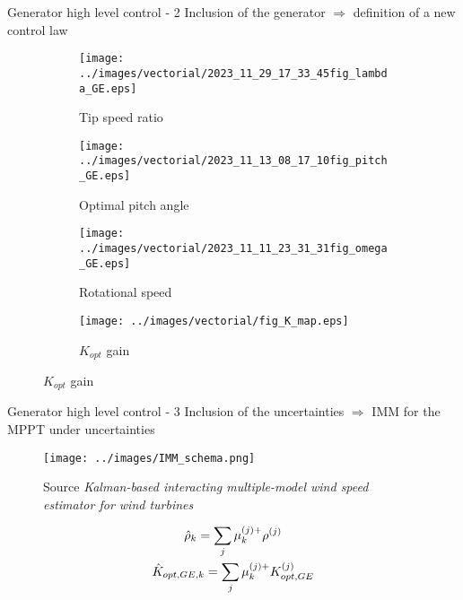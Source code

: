 \begin{frame}{Generator high level control - 2}
  Inclusion of the generator $\Rightarrow$ definition of a new control law \\
  \begin{figure}[!htbp]
    \begin{subfigure}{0.49\textwidth}
      \centering
      \texttt{[image: ../images/vectorial/2023\_11\_29\_17\_33\_45fig\_lambda\_GE.eps]}
      \caption{Tip speed ratio}
    \end{subfigure}
    \begin{subfigure}{0.49\textwidth}
      \centering
      \texttt{[image: ../images/vectorial/2023\_11\_13\_08\_17\_10fig\_pitch\_GE.eps]}
      \caption{Optimal pitch angle}
    \end{subfigure}
    \begin{subfigure}{0.49\textwidth}
      \centering
      \texttt{[image: ../images/vectorial/2023\_11\_11\_23\_31\_31fig\_omega\_GE.eps]}
      \caption{Rotational speed}
    \end{subfigure}
    \begin{subfigure}{0.49\textwidth}
      \centering
      \texttt{[image: ../images/vectorial/fig\_K\_map.eps]}
      \caption{$K_{opt}$ gain}
    \end{subfigure}
  \end{figure}
\end{frame}

\begin{frame}{Generator high level control - 3}
  Inclusion of the uncertainties $\Rightarrow$ IMM for the MPPT under uncertainties\\

  \begin{figure}[H]
    \centering
    \texttt{[image: ../images/IMM\_schema.png]}
    \caption{Source \textit{Kalman-based interacting multiple-model wind speed estimator for wind turbines}}
  \end{figure}
  \begin{gather}
    \notag
    \hat{\rho}_{k} = \sum_j \mu_k^{(j)+} \rho^{(j)}\\ \notag
    \hat{K}_{opt,GE,k} = \sum_j \mu_k^{(j)+} K_{opt,GE}^{(j)} 
  \end{gather}

\end{frame}

                                                        

